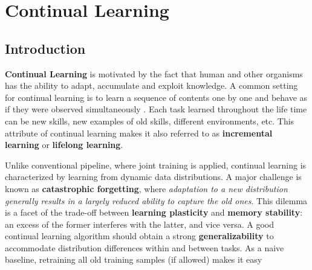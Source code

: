 \chapter{Continual Learning}
\section{Introduction}
\textbf{Continual Learning} is motivated by the fact that human and other organisms has the ability to adapt, accumulate and exploit knowledge. A common setting for continual learning is to learn a sequence of contents one by one and behave as if they were observed simultaneously \citep{wang2023comprehensive}. Each task learned throughout the life time can be new skills, new examples of old skills, different environments, etc. This attribute of continual learning makes it also referred to as \textbf{incremental learning} or \textbf{lifelong learning}.

Unlike conventional pipeline, where joint training is applied, continual learning is characterized by learning from dynamic data distributions. A major challenge is known as \textbf{catastrophic forgetting}, where \textit{adaptation to a new distribution generally results in a largely reduced ability to capture the old ones}. This dilemma is a facet of the trade-off between \textbf{learning plasticity} and \textbf{memory stability}: an excess of the former interferes with the latter, and vice versa. A good continual learning algorithm should obtain a strong \textbf{generalizability} to accommodate distribution differences within and between tasks. As a naive baseline, retraining all old training samples (if allowed) makes it easy
